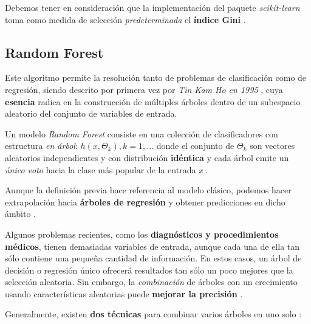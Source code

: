 Debemos tener en consideración que la implementación del paquete \textit{scikit-learn} toma como medida de selección \textit{predeterminada} el \textbf{índice Gini} \cite{Pedregosa2011Scikit-learn:Python}.


\subsection{Random Forest}

Este algoritmo permite la resolución tanto de problemas de clasificación como de regresión, siendo descrito por primera vez por \textit{Tin Kam Ho en 1995}  \cite{Ho1995RandomForests}, cuya \textbf{esencia} radica en la construcción de múltiples árboles dentro de un subespacio aleatorio del conjunto de variables de entrada.

Un modelo \textit{Random Forest} consiste en una colección de clasificadores con estructura \textit{en árbol}: 
\({h(x,\Theta_{k}), k = 1, ...}\)
donde el conjunto de 
\(\Theta_{k}\) son vectores aleatorios independientes y con distribución \textbf{idéntica} y cada árbol emite un \textit{único voto} hacia la clase más popular de la entrada \textit{x} \cite{Breiman2001RandomForests}.

Aunque la definición previa hace referencia al modelo clásico, podemos hacer extrapolación hacia \textbf{árboles de regresión} y obtener predicciones en dicho ámbito  \cite{Belyadi2021SupervisedLearning}.


Algunos problemas recientes, como los \textbf{diagnósticos y procedimientos médicos}, tienen demasiadas variables de entrada, aunque cada una de ella tan sólo contiene una pequeña cantidad de información. En estos casos, un árbol de decisión o regresión único ofrecerá resultados tan sólo un poco mejores que la selección aleatoria. Sin embargo, la \textit{combinación} de árboles con un crecimiento usando características aleatorias puede \textbf{mejorar la precisión} \cite{Breiman2001RandomForests}.

Generalmente, existen \textbf{dos técnicas} para combinar varios árboles en uno solo \cite{Belyadi2021SupervisedLearning}:

